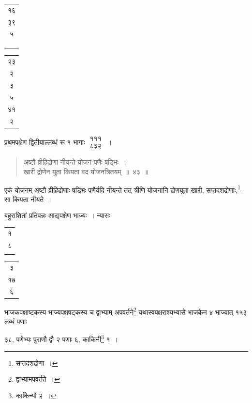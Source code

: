 \documentclass[10pt, openany]{book}
\begin{document}
{{\newpage

\hspace{40mm} \begin{tabular}{c}१६ \\३९ \\५ \\ \\ \\ \\ \end{tabular}
\begin{tabular}{c}२३\\  २ \\३ \\५  \\४१ \\२\end{tabular}
\vspace{0.1cm}

{प्रथमपक्षेण द्वितीयाल्लब्धं रू १ भागाः $\begin{matrix}

\mbox{{१११}}\\

\mbox{{८३२}}

\end{matrix}$}~।

\vspace{0.3cm}{उदाहरणम्\textemdash}

\begin{quote}
    
{\eg अष्टौ व्रीहिद्रोणा नीयन्ते योजनं पणैः षड्भिः~। \\
 खारी द्रोणेन युता कियता वद योजनत्रितयम्~॥~४३~॥}\end{quote}

{एकं योजनम् अष्टौ व्रीहिद्रोणाः षड्भिः पणैर्यदि नीयन्ते तत् त्रीणि
योजनानि द्रोणयुता खारी, सप्तदशद्रोणाः,\renewcommand{\thefootnote}{\s १}\footnote{\s सप्तदशद्रोणा~।}  सा कियता नीयते~।}

{बहुराशितां प्रतिपन्नः आद्यपक्षेण भाज्यः~। न्यासः \begin{tabular}{c}१ \\८ \\ \\ \end{tabular}\begin{tabular}{|c}३  \\१७ \\ ६\end{tabular}
भाजकपक्षाष्टकस्य भाज्यपक्षषट्कस्य च द्वाभ्याम् अपवर्तने\renewcommand{\thefootnote}{\s ४}\footnote{\s द्वाभ्यामपवर्तते~।}  यथास्वपक्षराश्यभ्यासे भाजकेन ४ भाज्यात्
१५३ लब्धं पणाः}
{३८, पणेभ्यः पुराणौ द्वौ २ पणाः ६, काकिनी\renewcommand{\thefootnote}{\s ५}\footnote{\s काकिन्यौ २~।}  १~।}

}}
\end{document}
